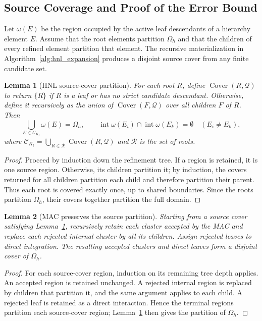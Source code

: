 \documentclass[a4paper,pdflatex,sn-mathphys-num]{sn-jnl}
\theoremstyle{thmstyleone}
\newtheorem{lemma}{Lemma}
\begin{document}
\subsection{Source Coverage and Proof of the Error Bound}
\label{app:hnl_coverage}
\label{app:error_bound}

Let $\omega(E)$ be the region occupied by the active leaf descendants of a hierarchy element $E$. Assume that the root elements partition $\Omega_h$ and that the children of every refined element partition that element. The recursive materialization in Algorithm~\ref{alg:hnl_expansion} produces a disjoint source cover from any finite candidate set.

\begin{lemma}[HNL source-cover partition]
\label{lem:hnl_cover}
For each root $R$, define $\operatorname{Cover}(R,\mathcal Q)$ to return $\{R\}$ if $R$ is a leaf or has no strict candidate descendant. Otherwise, define it recursively as the union of $\operatorname{Cover}(F,\mathcal Q)$ over all children $F$ of $R$. Then
\[
\bigcup_{E\in\mathcal C_{K_t}}\omega(E)=\Omega_h,
\qquad
\operatorname{int}\omega(E_i)\cap\operatorname{int}\omega(E_k)=\emptyset
\quad (E_i\ne E_k),
\]
where $\mathcal C_{K_t}=\bigcup_{R\in\mathcal R}\operatorname{Cover}(R,\mathcal Q)$ and $\mathcal R$ is the set of roots.
\end{lemma}

\begin{proof}
Proceed by induction down the refinement tree. If a region is retained, it is one source region. Otherwise, its children partition it; by induction, the covers returned for all children partition each child and therefore partition their parent. Thus each root is covered exactly once, up to shared boundaries. Since the roots partition $\Omega_h$, their covers together partition the full domain.
\end{proof}

\begin{lemma}[MAC preserves the source partition]
\label{lem:mac_cover}
Starting from a source cover satisfying Lemma~\ref{lem:hnl_cover}, recursively retain each cluster accepted by the MAC and replace each rejected internal cluster by all its children. Assign rejected leaves to direct integration. The resulting accepted clusters and direct leaves form a disjoint cover of $\Omega_h$.
\end{lemma}

\begin{proof}
For each source-cover region, induction on its remaining tree depth applies. An accepted region is retained unchanged. A rejected internal region is replaced by children that partition it, and the same argument applies to each child. A rejected leaf is retained as a direct interaction. Hence the terminal regions partition each source-cover region; Lemma~\ref{lem:hnl_cover} then gives the partition of $\Omega_h$.
\end{proof}
\end{document}
